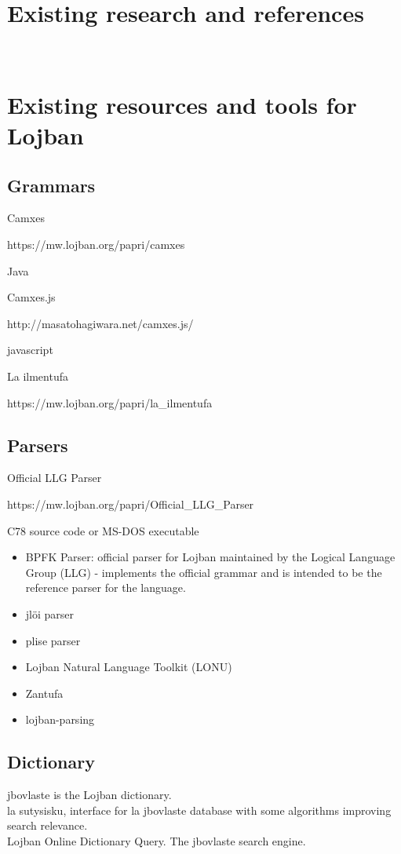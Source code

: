 \chapter{Existing research and references}

\newpage \thispagestyle{empty} \ \newpage

\chapter{Existing resources and tools for Lojban}
\label{chap:existing-resources-and-tools}

\vspace{0.5cm}

\section*{Grammars}
\label{section:lojban-grammars}

Camxes

https://mw.lojban.org/papri/camxes

Java

Camxes.js

http://masatohagiwara.net/camxes.js/

javascript

La ilmentufa

https://mw.lojban.org/papri/la\_ilmentufa


\section*{Parsers}

Official LLG Parser

https://mw.lojban.org/papri/Official\_LLG\_Parser

C78 source code
or
MS-DOS executable

\begin{itemize}
    \item BPFK Parser: official parser for Lojban maintained by the Logical Language Group (LLG) - implements the official grammar and is intended to be the reference parser for the language.
    \item jlöi parser
    \item plise parser
    \item Lojban Natural Language Toolkit (LONU)
    \item Zantufa
    \item lojban-parsing
\end{itemize}

\section*{Dictionary}
\label{sec:dictionary}

jbovlaste is the Lojban dictionary. \\

la sutysisku, interface for la jbovlaste database with some algorithms improving search relevance. \\

Lojban Online Dictionary Query. The jbovlaste search engine.\\